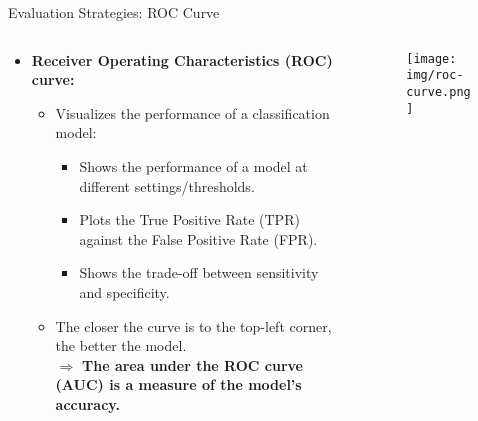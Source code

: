 \begin{frame}{Evaluation Strategies: ROC Curve}
	\begin{columns}
		\begin{column}{0.5\textwidth}
			\begin{itemize}
				\item \textbf{Receiver Operating Characteristics (ROC) curve:}
				      \begin{itemize}
					      \item Visualizes the performance of a classification model:
					            \begin{itemize}
						            \item Shows the performance of a model at different settings/thresholds.
						            \item Plots the True Positive Rate (TPR) \\ against the False Positive Rate (FPR).
						            \item Shows the trade-off between sensitivity and specificity.
					            \end{itemize}
					      \item The closer the curve is to the top-left corner, the better the model. \\
					            $\Rightarrow$ \textbf{\color{airforceblue}The area under the ROC curve (AUC) is a measure of the model's accuracy.}
				      \end{itemize}
			\end{itemize}
		\end{column}
		\begin{column}{0.4\textwidth}
			\vspace*{-1.5em}
			\begin{figure}
				\centering
				\texttt{[image: img/roc-curve.png]}
			\end{figure}
			\vspace*{-0.5em}
		\end{column}
	\end{columns}
\end{frame}
